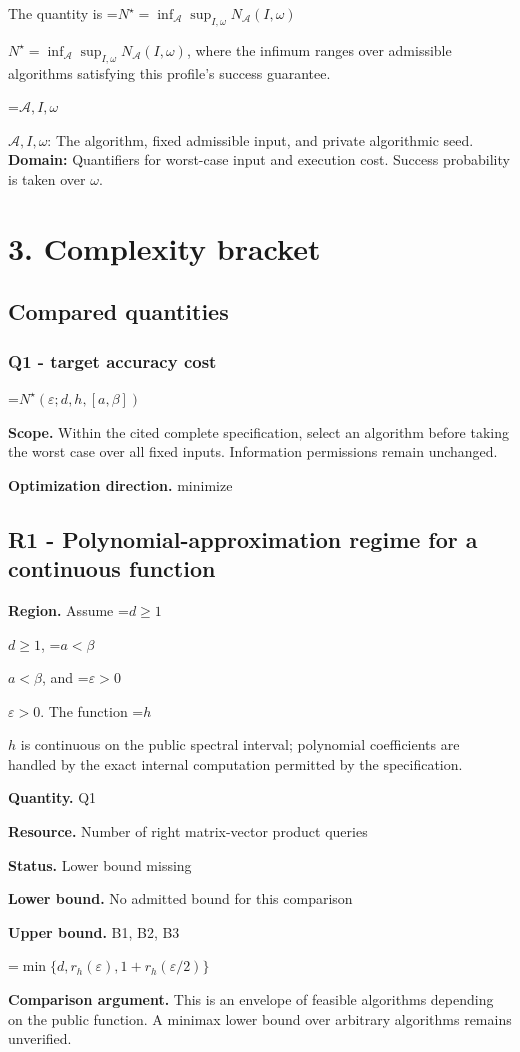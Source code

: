 \documentclass[10pt,a4paper]{article}
\newcommand{\AtlasMath}[1]{\par\begingroup\centering\setbox0=\hbox{$\displaystyle #1$}\ifdim\wd0>1.4\linewidth\typeout{ATLAS WIDE FORMULA: \the\wd0}\fi\ifdim\wd0>\linewidth\resizebox{\linewidth}{!}{\box0}\else\box0\fi\par\endgroup}
\newcommand{\AtlasInlineMath}[1]{\begingroup\setbox0=\hbox{$#1$}\ifdim\wd0>.4\linewidth\endgroup\AtlasMath{#1}\else\endgroup$#1$\fi}
\begin{document}
The quantity is \AtlasInlineMath{N^\star=\inf_{\mathcal A}\sup_{I,\omega}N_{\mathcal A}(I,\omega)}, where the infimum ranges over admissible algorithms satisfying this profile's success guarantee.

\AtlasInlineMath{\mathcal A,I,\omega}: The algorithm, fixed admissible input, and private algorithmic seed. \textbf{Domain:} Quantifiers for worst-case input and execution cost. Success probability is taken over $\omega$.

\section{3. Complexity bracket}
\subsection{Compared quantities}
\subsubsection{Q1 - target accuracy cost}
\AtlasMath{N^\star(\varepsilon;d,h,[a,\beta])}
\textbf{Scope.} Within the cited complete specification, select an algorithm before taking the worst case over all fixed inputs. Information permissions remain unchanged.

\textbf{Optimization direction.} minimize

\subsection{R1 - Polynomial-approximation regime for a continuous function}
\textbf{Region.} Assume \AtlasInlineMath{d\ge1}, \AtlasInlineMath{a<\beta}, and \AtlasInlineMath{\varepsilon>0}. The function \AtlasInlineMath{h} is continuous on the public spectral interval; polynomial coefficients are handled by the exact internal computation permitted by the specification.

\textbf{Quantity.} Q1

\textbf{Resource.} Number of right matrix-vector product queries

\textbf{Status.} Lower bound missing

\textbf{Lower bound.} No admitted bound for this comparison

\textbf{Upper bound.} B1, B2, B3

\AtlasMath{\min\{d,r_h(\varepsilon),1+r_h(\varepsilon/2)\}}
\textbf{Comparison argument.} This is an envelope of feasible algorithms depending on the public function. A minimax lower bound over arbitrary algorithms remains unverified.
\end{document}
